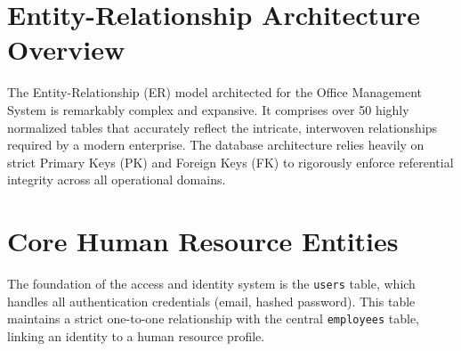 ﻿\documentclass[12pt,a4paper]{report}
\begin{document}
\newpage
\section*{Entity-Relationship Architecture Overview}
The Entity-Relationship (ER) model architected for the Office Management System is remarkably complex and expansive. It comprises over 50 highly normalized tables that accurately reflect the intricate, interwoven relationships required by a modern enterprise. The database architecture relies heavily on strict Primary Keys (PK) and Foreign Keys (FK) to rigorously enforce referential integrity across all operational domains.

\section*{Core Human Resource Entities}
The foundation of the access and identity system is the \texttt{users} table, which handles all authentication credentials (email, hashed password). This table maintains a strict one-to-one relationship with the central \texttt{employees} table, linking an identity to a human resource profile. 
\end{document}
